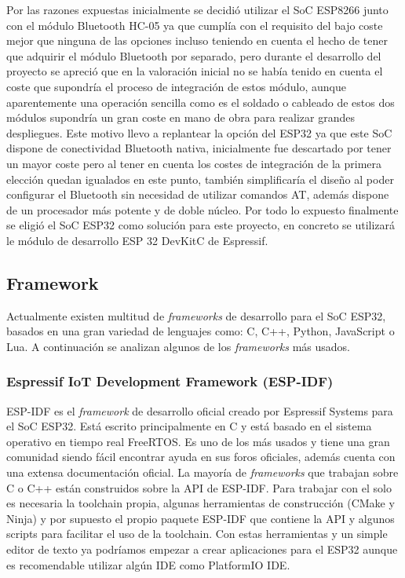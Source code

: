 \documentclass[../proyecto.tex]{subfiles}
\begin{document}
Por las razones expuestas inicialmente se decidió utilizar el SoC ESP8266 junto con el módulo Bluetooth HC-05 ya que cumplía con el requisito del bajo coste mejor que ninguna de las opciones incluso teniendo en cuenta el hecho de tener que adquirir el módulo Bluetooth por separado, pero durante el desarrollo del proyecto se apreció que en la valoración inicial no se había tenido en cuenta el coste que supondría el proceso de integración de estos módulo, aunque aparentemente una operación sencilla como es el soldado o cableado de estos dos módulos supondría un gran coste en mano de obra para realizar grandes despliegues. Este motivo llevo a replantear la opción del ESP32 ya que este SoC dispone de conectividad Bluetooth nativa, inicialmente fue descartado por tener un mayor coste pero al tener en cuenta los costes de integración de la primera elección quedan igualados en este punto, también simplificaría el diseño al poder configurar el Bluetooth sin necesidad de utilizar comandos AT, además dispone de un procesador más potente y de doble núcleo. Por todo lo expuesto finalmente se eligió el SoC ESP32 como solución para este proyecto, en concreto se utilizará le módulo de desarrollo ESP 32 DevKitC de Espressif.\\

\subsection{Framework}

Actualmente existen multitud de \textit{frameworks} de desarrollo para el SoC ESP32, basados en una gran variedad de lenguajes como: C, C++, Python, JavaScript o Lua. A continuación se analizan algunos de los  \textit{frameworks} más usados.\\

\subsubsection{Espressif IoT Development Framework (ESP-IDF)}
ESP-IDF es el \textit{framework} de desarrollo oficial creado por Espressif Systems para el SoC ESP32. Está escrito principalmente en C  y está basado en el sistema operativo en tiempo real FreeRTOS. Es uno de los más usados y tiene una gran comunidad siendo fácil encontrar ayuda en sus foros oficiales, además cuenta con una extensa documentación oficial. La mayoría de \textit{frameworks} que trabajan sobre C o C++ están construidos sobre la API de ESP-IDF. Para trabajar con el solo es necesaria la toolchain propia, algunas herramientas de construcción (CMake y Ninja) y por supuesto el propio paquete ESP-IDF que contiene la API y algunos scripts para facilitar el uso de la toolchain. Con estas herramientas y un simple editor de texto ya podríamos empezar a crear aplicaciones para el ESP32 aunque es recomendable utilizar algún IDE como PlatformIO IDE.\\
\end{document}

